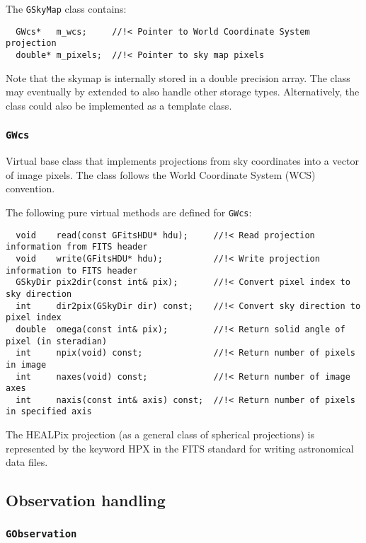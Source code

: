 \documentclass{article}[12pt,a4]
\begin{document}
The {\tt GSkyMap} class contains:
\begin{verbatim}
  GWcs*   m_wcs;     //!< Pointer to World Coordinate System projection
  double* m_pixels;  //!< Pointer to sky map pixels
\end{verbatim}

Note that the skymap is internally stored in a double precision array.
The class may eventually by extended to also handle other storage types.
Alternatively, the class could also be implemented as a template class.


\subsubsection{{\tt GWcs}}

Virtual base class that implements projections from sky coordinates into a vector of
image pixels.
The class follows the World Coordinate System (WCS) convention.

The following pure virtual methods are defined for {\tt GWcs}:
\begin{verbatim}
  void    read(const GFitsHDU* hdu);     //!< Read projection information from FITS header
  void    write(GFitsHDU* hdu);          //!< Write projection information to FITS header
  GSkyDir pix2dir(const int& pix);       //!< Convert pixel index to sky direction
  int     dir2pix(GSkyDir dir) const;    //!< Convert sky direction to pixel index
  double  omega(const int& pix);         //!< Return solid angle of pixel (in steradian)
  int     npix(void) const;              //!< Return number of pixels in image
  int     naxes(void) const;             //!< Return number of image axes
  int     naxis(const int& axis) const;  //!< Return number of pixels in specified axis
\end{verbatim}

The HEALPix projection (as a general class of spherical projections) is represented by the 
keyword HPX in the FITS standard for writing astronomical data files.


\subsection{Observation handling}

\subsubsection{{\tt GObservation}}
\end{document}
